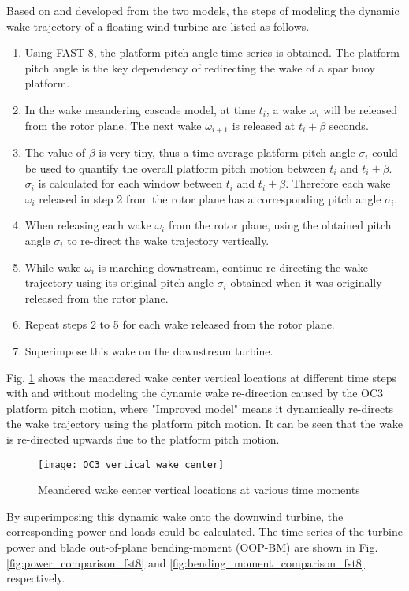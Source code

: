 \documentclass{umthesis}
\begin{document}
Based on and developed from the two models, the steps of modeling the dynamic wake trajectory of a floating wind turbine are listed as follows.
\begin{enumerate}
  \item Using FAST 8, the platform pitch angle time series is obtained. The platform pitch angle is the key dependency of redirecting the wake of a spar buoy platform.
  \item In the wake meandering cascade model, at time $t_i$, a wake $\omega_i$ will be released from the rotor plane. The next wake $\omega_{i+1}$ is released at  $t_i+ \beta$ seconds.
  \item The value of $\beta$ is very tiny, thus a time average platform pitch angle $\sigma_i$ could be used to quantify the overall platform pitch motion between $t_i$ and $t_i+ \beta$. $\sigma_i$ is calculated for each window between $t_i$ and $t_i+ \beta$. Therefore each wake $\omega_i$ released in step 2 from the rotor plane has a corresponding pitch angle $\sigma_i$. 
  \item When releasing each wake $\omega_i$ from the rotor plane, using the obtained pitch angle $\sigma_i$ to re-direct the wake trajectory vertically.
  \item While wake $\omega_i$ is marching downstream, continue re-directing the wake trajectory using its original pitch angle $\sigma_i$ obtained when it was originally released from the rotor plane.
  \item Repeat steps 2 to 5 for each wake released from the rotor plane.
  \item Superimpose this wake on the downstream turbine.  
\end{enumerate}

Fig. \ref{fig:OC3_vertical_wake_center} shows the meandered wake center vertical locations at different time steps with and without modeling the dynamic wake re-direction caused by the OC3 platform pitch motion, where "Improved model" means it dynamically re-directs the wake trajectory using the platform pitch motion. It can be seen that the wake is re-directed upwards due to the platform pitch motion.   

\begin{figure}
  \centering
  \texttt{[image: OC3\_vertical\_wake\_center]}
  \caption{Meandered wake center vertical locations at various time moments}\label{fig:OC3_vertical_wake_center}
\end{figure}

By superimposing this dynamic wake onto the downwind turbine, the corresponding power and loads could be calculated. The time series of the turbine power and blade out-of-plane bending-moment (OOP-BM) are shown in Fig. \ref{fig:power_comparison_fst8} and \ref{fig:bending_moment_comparison_fst8} respectively.   
\end{document}
